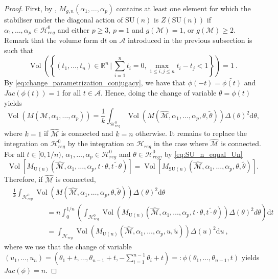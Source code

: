 \documentclass[11pt,a4paper]{amsart}
\providecommand{\diff}{\mathrm d}
\providecommand{\U}{\mathrm U}
\providecommand{\SU}{\mathrm {SU}}
\providecommand{\Vol}{\operatorname{Vol}}
\numberwithin{equation}{section}
\theoremstyle{definition}
\begin{document}
\begin{proof}
First, by \autocite[Thm. 5.20]{bismut5symplectic}, $M_{g,n}(\alpha_1,\ldots,\alpha_p)$ contains at least one element 
for which the stabiliser under the diagonal action of $\SU(n)$ is $Z(\SU(n))$ if $\alpha_1,\ldots,\alpha_p\in\mathcal{H}_{reg}^0$ 
and either $p\geqslant 3$, $p=1$ and $g(\mathcal{M})=1$, or $g(\mathcal{M})\geqslant 2$.
Remark that the volume form $\diff t$ on $\mathcal{A}$ introduced in the previous subsection is such that 
$$\Vol\left(\left\{(t_1,\ldots,t_n)\in \mathbb{R}^n \, \Big\vert \, \sum_{i=1}^nt_i=0, \max_{1\leqslant i,j\leqslant n}t_i-t_j<1\right\}\right)=1 \ .$$
By \eqref{eq:change_parametrization_conjugacy}, we have that $\phi(-t)=\widetilde{\phi(t)}$ and $Jac(\phi(t))=1$ for all $t\in\mathcal{A}$. 
Hence, doing the change of variable $\theta=\phi(t)$ yields
$$\Vol(M(\mathcal{M},\alpha_1,\ldots,\alpha_p))=\frac{1}{k}\int_{\mathcal{H}_{reg}^0}
\Vol(M(\widehat{\mathcal{M}},\alpha_1,\ldots,\alpha_p,\theta,\widetilde{\theta}))\Delta(\theta)^2 \diff \theta,$$
where $k=1$ if $\widehat{\mathcal{M}}$ is connected and $k=n$ otherwise. 
It remains to replace the integration on $\mathcal{H}^0_{reg}$ by the integration on $\mathcal{H}_{reg}$ in the case where $\widehat{\mathcal{M}}$ is connected. 
For all $t\in [0,1/n)$, $\alpha_1,\ldots,\alpha_p\in \mathcal{H}_{reg}^0$ and $\theta\in \mathcal{H}_{reg}^0$, by \eqref{eq:SU_n_equal_Un}
$$\Vol\left[ M_{\U(n)}(\widehat{\mathcal{M}},\alpha_1,\ldots,\alpha_p,t\cdot\theta,\widetilde{t\cdot\theta})\right]  = 
\Vol \left[M_{\SU(n)}\left(\widehat{\mathcal{M}},\alpha_1,\ldots,\alpha_p,\theta,\widetilde{\theta}\right)\right] . $$
Therefore, if $\hat{\mathcal{M}}$ is connected,
\begin{align*}
&\frac{1}{k}\int_{\mathcal{H}_{reg}^0}\Vol(M(\widehat{\mathcal{M}},\alpha_1,\ldots,\alpha_p,\theta,\widetilde{\theta}))\Delta(\theta)^2 \diff \theta\\
&\hspace{2cm}=n\int_{0}^{1/n}\left(\int_{\mathcal{H}_{reg}^0}\Vol(M_{\U(n)}(\widehat{\mathcal{M}},\alpha_1,\ldots,\alpha_p,t\cdot\theta, 
\widetilde{t\cdot\theta}))\Delta(\theta)^2d\theta\right) \diff t\\
&\hspace{2cm}=\int_{\mathcal{H}_{reg}}\Vol(M_{\U(n)}(\widehat{\mathcal{M}},\alpha_1,\ldots,\alpha_p,u,\widetilde{u}))\Delta(u)^2 \diff u \ ,
\end{align*}
where we use that the change of variable $(u_1,\ldots,u_n)=
(\theta_1+t,\ldots,\theta_{n-1}+t,-\sum_{i=1}^{n-1}\theta_i+t)=:\phi(\theta_1,\ldots,\theta_{n-1},t)$ yields $Jac(\phi)=n$.
\end{proof}
\end{document}
